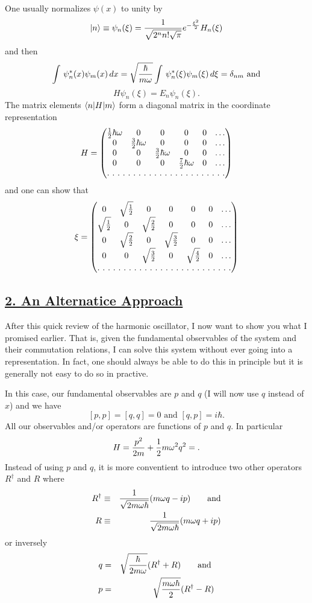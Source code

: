 One usually normalizes $\psi(x)$ to unity by
$$|n\rangle \equiv \psi_n(\xi) = {1\over\sqrt{2^n n!\sqrt{\pi}}}e^{-{\xi^2\over 2}} H_n(\xi)$$ and then 
$$\int\, \psi^*_n(x) \psi_m(x)\, dx = \sqrt{{\hbar\over m\omega}} \int\, \psi^*_n(\xi) \psi_m(\xi)\, d\xi = \delta_{nm}\mbox{  and}$$
$$H\psi_n(\xi) = E_n\psi_n(\xi).$$
The matrix elements $\langle n| H| m \rangle$ form a diagonal matrix in the coordinate representation
\[ H = \begin{pmatrix}
\half\hbar\omega & 0  & 0 & 0& 0& \hdots  \\
0  & {3\over2} \hbar\omega & 0&  0& 0& \hdots  \\
0 & 0   & {3\over2}\hbar\omega& 0& 0& \hdots \\
0 & 0   & 0 & {7\over2}\hbar\omega & 0& \hdots \\
\hdotsfor[2]{6}\\
\end{pmatrix} \]
and one can show that 
\[ \xi  = \begin{pmatrix}
0 & \sqrt{1\over2} & 0  & 0 & 0& 0& \hdots  \\
\sqrt{1\over2} & 0  & \sqrt{2\over2} & 0&  0& 0& \hdots  \\
0& \sqrt{2\over2}  & 0   & \sqrt{3\over2}& 0& 0& \hdots \\
0& 0 & \sqrt{3\over2}   & 0 & \sqrt{4\over2} & 0& \hdots \\
\hdotsfor[2]{7}\\
\end{pmatrix} \] \label{4-VII}

\subsection{\underline{2. An Alternatice Approach}}
After this quick review of the harmonic oscillator, I now want to show you what I promised earlier. That is, given the fundamental observables of the system and their commutation relations, I can 
solve this system without ever going into a representation. In fact, one should always be able to do this in principle but it is generally not easy to do so in practive. 

In this case, our fundamental observables are $p$ and $q$ (I will now use $q$ instead of $x$) and we have
$$\left[ p,p\right] = \left[q,q\right] = 0\mbox{   and  } \left[q,p\right] = i\hbar.$$
All our observables and/or operators are functions of $p$ and $q$. In particular
$$H = {p^2\over2m} + {1\over2} m\omega^2 q^2 = .$$
Instead of using $p$ and $q$, it is more conventient to introduce two other operators $R^\dagger$ and $R$ where 
\begin{eqnarray*}
R^\dagger &\equiv& {1\over\sqrt{2m\omega\hbar}}(m\omega q - ip)\mbox{~~~~~        and} \\
R               &\equiv& {1\over\sqrt{2m\omega\hbar}}(m\omega q + ip)
\end{eqnarray*}
or inversely
\begin{eqnarray*}
q &=& \sqrt{\hbar\over2m\omega} (R^\dagger + R)\mbox{~~~~~         and } \\
p &=& \sqrt{m\omega\hbar\over2} (R^\dagger  - R)
\end{eqnarray*}

